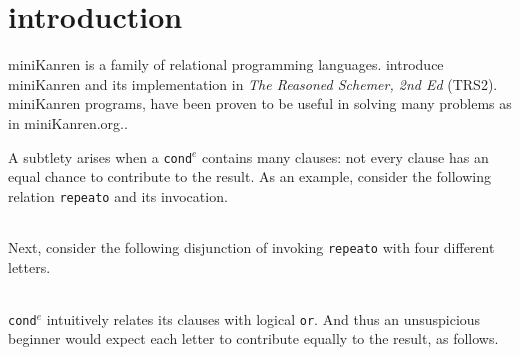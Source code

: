 \documentclass[format=acmlarge, review=true, authordraft=true]{acmart}
\newcommand{\conde}{\texttt{cond$^e$}}
\newcommand{\clisting}[1]{
\begin{center}
  \begin{tabular}{c}
	
    \end{tabular}
\end{center}
}
\begin{document}
\section{introduction}

miniKanren is a family of relational programming languages.
\citet{friedman_reasoned_2018} introduce miniKanren and its
implementation in \emph{The Reasoned Schemer, 2nd Ed}
(TRS2). miniKanren programs, have been proven to be useful in solving 
many problems as in miniKanren.org.\citet{byrd2017unified}.








A subtlety arises 
when a \conde{} contains many clauses: not every clause has an 
equal chance to contribute to the result. As an example, consider the following 
relation \texttt{repeato} and its invocation. 

\clisting{Figures/repeato.rkt}

Next, consider the following disjunction of invoking \texttt{repeato} with four 
different letters.

\clisting{Figures/example.rkt}

\conde{} intuitively relates its clauses with logical \texttt{or}. And thus an 
unsuspicious beginner would expect each letter to contribute equally to the 
result, as follows.

\clisting{Figures/run-repeato-fair.rkt}
\end{document}
